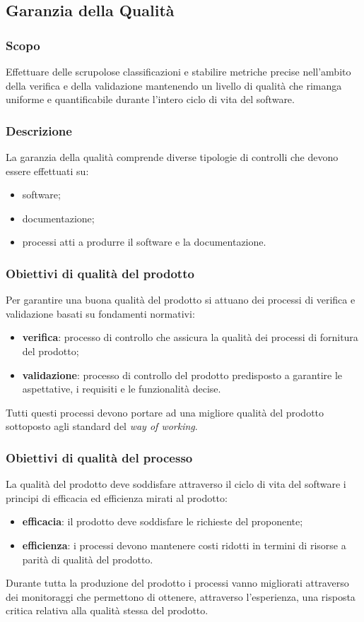 \subsection{Garanzia della Qualità}
					
	\subsubsection{Scopo}
	Effettuare delle scrupolose classificazioni e stabilire metriche precise nell'ambito della verifica e della validazione mantenendo un livello di qualità che rimanga uniforme e quantificabile durante l'intero ciclo di vita del software.
					
	\subsubsection{Descrizione}
	La garanzia della qualità comprende diverse tipologie di controlli che devono essere effettuati su:
	\begin{itemize}
		\item software;
		\item documentazione;
		\item processi atti a produrre il software e la documentazione.						
	\end{itemize}	
				
	\subsubsection{Obiettivi di qualità del prodotto}	
	Per garantire una buona qualità del prodotto si attuano dei processi di verifica e validazione basati su fondamenti normativi:
	\begin{itemize}
		\item \textbf{verifica}: processo di controllo che assicura la qualità dei processi di fornitura del prodotto;
		\item \textbf{validazione}: processo di controllo del prodotto predisposto a garantire le aspettative, i requisiti e le funzionalità decise.
	\end{itemize}
	Tutti questi processi devono portare ad una migliore qualità del prodotto sottoposto agli standard del \textit{way of working}.
					
	\subsubsection{Obiettivi di qualità del processo}
	La qualità del prodotto deve soddisfare attraverso il ciclo di vita del software i principi di efficacia ed efficienza mirati al prodotto:
	\begin{itemize}
		\item \textbf{efficacia}: il prodotto deve soddisfare le richieste del proponente;
		\item \textbf{efficienza}: i processi devono mantenere costi ridotti in termini di risorse a parità di qualità del prodotto.
	\end{itemize}
	Durante tutta la produzione del prodotto i processi vanno migliorati attraverso dei monitoraggi che permettono di ottenere, attraverso l'esperienza, una risposta critica relativa alla qualità stessa del prodotto.
					
